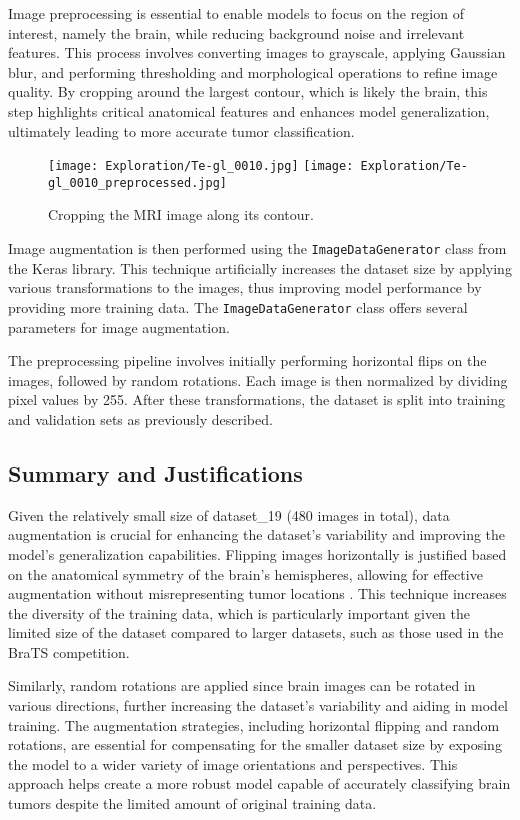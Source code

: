 Image preprocessing is essential to enable models to focus on the region of interest, namely the brain, while reducing background noise and irrelevant features. This process involves converting images to grayscale, applying Gaussian blur, and performing thresholding and morphological operations to refine image quality. By cropping around the largest contour, which is likely the brain, this step highlights critical anatomical features and enhances model generalization, ultimately leading to more accurate tumor classification.

\begin{figure}[H]
  \begin{center}
    \texttt{[image: Exploration/Te-gl\_0010.jpg]}
    \texttt{[image: Exploration/Te-gl\_0010\_preprocessed.jpg]}
  \end{center}
  \caption{Cropping the MRI image along its contour.}\label{fig:image_cropping}
\end{figure}

Image augmentation is then performed using the \texttt{ImageDataGenerator} class from the Keras library. This technique artificially increases the dataset size by applying various transformations to the images, thus improving model performance by providing more training data. The \texttt{ImageDataGenerator} class offers several parameters for image augmentation.

The preprocessing pipeline involves initially performing horizontal flips on the images, followed by random rotations. Each image is then normalized by dividing pixel values by 255. After these transformations, the dataset is split into training and validation sets as previously described.

\subsection{Summary and Justifications}

Given the relatively small size of dataset\_19 (480 images in total), data augmentation is crucial for enhancing the dataset's variability and improving the model's generalization capabilities. Flipping images horizontally is justified based on the anatomical symmetry of the brain's hemispheres, allowing for effective augmentation without misrepresenting tumor locations \cite{nalepa_data_2019}. This technique increases the diversity of the training data, which is particularly important given the limited size of the dataset compared to larger datasets, such as those used in the BraTS competition.

Similarly, random rotations are applied since brain images can be rotated in various directions, further increasing the dataset's variability and aiding in model training. The augmentation strategies, including horizontal flipping and random rotations, are essential for compensating for the smaller dataset size by exposing the model to a wider variety of image orientations and perspectives. This approach helps create a more robust model capable of accurately classifying brain tumors despite the limited amount of original training data.

